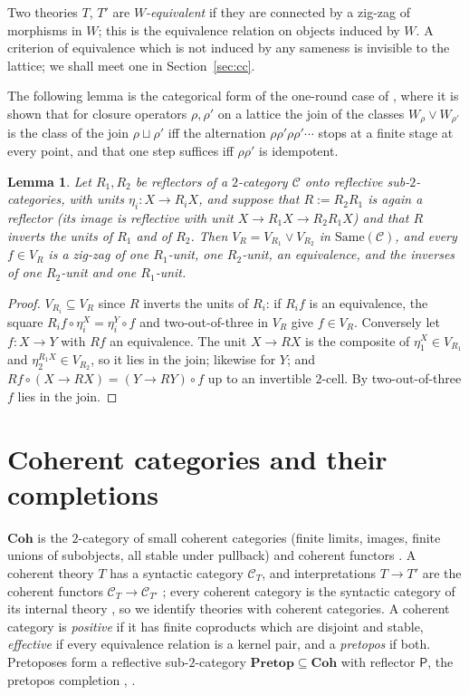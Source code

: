 \documentclass[11pt]{amsart}
\newtheorem{lem}[thm]{Lemma}
\theoremstyle{definition}
\newcommand{\Same}{\mathrm{Same}}
\newcommand{\Coh}{\mathbf{Coh}}
\newcommand{\Pretop}{\mathbf{Pretop}}
\newcommand{\PP}{\mathsf P}
\newcommand{\cC}{\mathcal C}
\begin{document}
Two theories $T$, $T'$ are \emph{$W$-equivalent} if they are connected by
a zig-zag of morphisms in $W$; this is the equivalence relation on
objects induced by $W$. A criterion of equivalence which is not induced
by any sameness is invisible to the lattice; we shall meet one in
Section~\ref{sec:cc}.

The following lemma is the categorical form of the one-round case of
\cite[Thm.~2.3(iv)]{Cutpoints}, where it is shown that for closure
operators $\rho,\rho'$ on a lattice the join of the classes
$W_\rho\vee W_{\rho'}$ is the class of the join $\rho\sqcup\rho'$ iff the
alternation $\rho\rho'\rho\rho'\cdots$ stops at a finite stage at every
point, and that one step suffices iff $\rho\rho'$ is idempotent.

\begin{lem}\label{lem:join}
Let $R_1,R_2$ be reflectors of a $2$-category $\cC$ onto reflective
sub-$2$-categories, with units $\eta_i\colon X\to R_iX$, and suppose
that $R:=R_2R_1$ is again a reflector (its image is reflective with
unit $X\to R_1X\to R_2R_1X$) and that $R$ inverts the units of $R_1$
and of $R_2$. Then $V_R=V_{R_1}\vee V_{R_2}$ in $\Same(\cC)$, and every
$f\in V_R$ is a zig-zag of one $R_1$-unit, one $R_2$-unit, an
equivalence, and the inverses of one $R_2$-unit and one $R_1$-unit.
\end{lem}
\begin{proof}
$V_{R_i}\subseteq V_R$ since $R$ inverts the units of $R_i$: if $R_if$
is an equivalence, the square $R_i f\circ\eta_i^X=\eta_i^Y\circ f$ and
two-out-of-three in $V_R$ give $f\in V_R$. Conversely let $f\colon X\to
Y$ with $Rf$ an equivalence. The unit $X\to RX$ is the composite of
$\eta_1^X\in V_{R_1}$ and $\eta_2^{R_1X}\in V_{R_2}$, so it lies in the
join; likewise for $Y$; and $Rf\circ(X\to RX)=(Y\to RY)\circ f$ up to
an invertible $2$-cell. By two-out-of-three $f$ lies in the join.
\end{proof}

\section{Coherent categories and their completions}\label{sec:coh}

$\Coh$ is the $2$-category of small coherent categories (finite limits,
images, finite unions of subobjects, all stable under pullback) and
coherent functors \cite[A1.4]{Elephant}. A coherent theory $T$ has a
syntactic category $\cC_T$, and interpretations $T\to T'$ are the
coherent functors $\cC_T\to\cC_{T'}$ \cite[D1.4]{Elephant}; every
coherent category is the syntactic category of its internal theory
\cite[\S4]{Tsem17}, so we identify theories with coherent categories.
A coherent category is \emph{positive} if it has finite coproducts which
are disjoint and stable, \emph{effective} if every equivalence relation
is a kernel pair, and a \emph{pretopos} if both. Pretoposes form a
reflective sub-$2$-category $\Pretop\subseteq\Coh$ with reflector
$\PP$, the pretopos completion \cite[8.4]{MR77}, \cite[A3.3]{Elephant}.
\end{document}
